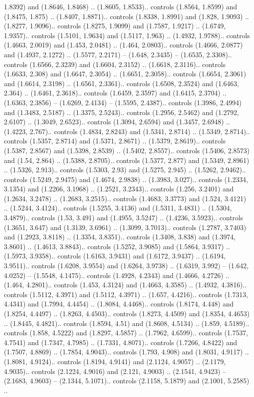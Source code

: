 1.8392) and (1.8646, 1.8468) .. (1.8605, 1.8533).. controls (1.8564, 1.8599) and (1.8475, 1.875) .. (1.8407, 1.8871).. controls (1.8338, 1.8991) and (1.828, 1.9093) .. (1.8277, 1.9096).. controls (1.8275, 1.9099) and (1.7587, 1.9217) .. (1.6749, 1.9357).. controls (1.5101, 1.9634) and (1.5117, 1.963) .. (1.4932, 1.9788).. controls (1.4663, 2.0019) and (1.453, 2.0481) .. (1.464, 2.0803).. controls (1.4666, 2.0877) and (1.4937, 2.1272) .. (1.5577, 2.2171) -- (1.648, 2.3435) -- (1.6535, 2.3308).. controls (1.6566, 2.3239) and (1.6604, 2.3152) .. (1.6618, 2.3116).. controls (1.6633, 2.308) and (1.6647, 2.3054) .. (1.6651, 2.3058).. controls (1.6654, 2.3061) and (1.6614, 2.3198) .. (1.6561, 2.3361).. controls (1.6508, 2.3524) and (1.6463, 2.364) .. (1.6461, 2.3618).. controls (1.6459, 2.3597) and (1.6415, 2.3704) .. (1.6363, 2.3856) -- (1.6269, 2.4134) -- (1.5595, 2.4387).. controls (1.3986, 2.4994) and (1.3483, 2.5187) .. (1.3375, 2.5243).. controls (1.2956, 2.5462) and (1.2792, 2.6107) .. (1.3049, 2.6523).. controls (1.3094, 2.6594) and (1.3457, 2.6948) .. (1.4223, 2.767).. controls (1.4834, 2.8243) and (1.5341, 2.8714) .. (1.5349, 2.8714).. controls (1.5357, 2.8714) and (1.5371, 2.8671) .. (1.5379, 2.8619).. controls (1.5387, 2.8567) and (1.5398, 2.8539) .. (1.5402, 2.8557).. controls (1.5406, 2.8573) and (1.54, 2.864) .. (1.5388, 2.8705).. controls (1.5377, 2.877) and (1.5349, 2.8961) .. (1.5326, 2.913).. controls (1.5303, 2.93) and (1.5275, 2.945) .. (1.5262, 2.9462).. controls (1.5249, 2.9475) and (1.4674, 2.9838) .. (1.3983, 3.027).. controls (1.2334, 3.1354) and (1.2266, 3.1968) .. (1.2521, 3.2343).. controls (1.256, 3.2401) and (1.2634, 3.2478) .. (1.2683, 3.2515).. controls (1.4683, 3.3773) and (1.524, 3.4121) .. (1.5244, 3.4124).. controls (1.5255, 3.4136) and (1.5311, 3.4831) .. (1.5304, 3.4879).. controls (1.53, 3.491) and (1.4955, 3.5247) .. (1.4236, 3.5923).. controls (1.3651, 3.647) and (1.3139, 3.6961) .. (1.3099, 3.7013).. controls (1.2787, 3.7403) and (1.2923, 3.8118) .. (1.3354, 3.8351).. controls (1.3408, 3.838) and (1.3974, 3.8601) .. (1.4613, 3.8843).. controls (1.5252, 3.9085) and (1.5864, 3.9317) .. (1.5973, 3.9358).. controls (1.6163, 3.9431) and (1.6172, 3.9437) .. (1.6194, 3.9511).. controls (1.6208, 3.9554) and (1.6264, 3.9738) .. (1.6319, 3.992) -- (1.642, 4.0252) -- (1.5548, 4.1475).. controls (1.4928, 4.2343) and (1.4666, 4.2726) .. (1.464, 4.2801).. controls (1.453, 4.3124) and (1.4663, 4.3585) .. (1.4932, 4.3816).. controls (1.5112, 4.3971) and (1.5112, 4.3971) .. (1.657, 4.4216).. controls (1.7313, 4.4341) and (1.7994, 4.4454) .. (1.8084, 4.4468).. controls (1.8174, 4.448) and (1.8254, 4.4497) .. (1.8263, 4.4503).. controls (1.8273, 4.4509) and (1.8354, 4.4653) .. (1.8445, 4.4821).. controls (1.8594, 4.51) and (1.8608, 4.5134) .. (1.859, 4.5189).. controls (1.858, 4.5222) and (1.8297, 4.5857) .. (1.7962, 4.6599).. controls (1.7537, 4.7541) and (1.7347, 4.7985) .. (1.7331, 4.8071).. controls (1.7266, 4.8422) and (1.7507, 4.8869) .. (1.7854, 4.9043).. controls (1.793, 4.908) and (1.8031, 4.9117) .. (1.8081, 4.9124).. controls (1.8194, 4.9141) and (2.1124, 4.9057) .. (2.1179, 4.9035).. controls (2.1224, 4.9016) and (2.121, 4.9003) .. (2.1541, 4.9423) -- (2.1683, 4.9603) -- (2.1344, 5.1071).. controls (2.1158, 5.1879) and (2.1001, 5.2585) .. 